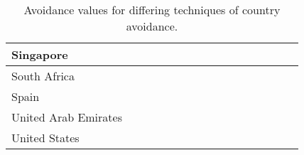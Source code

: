 \begin{table*}[t]
\begin{tabular}{|P{37mm}|ccc|ccc|ccc|ccc|ccc|}
Singapore            &     &   &     &  &    &   &    &     &  & \\\hline
South Africa         &     &   &     &  &    &   &    &     &  & \\\hline
Spain                &     &   &     &  &    &   &    &     &  & \\\hline
United Arab Emirates &     &   &     &  &    &   &    &     &  & \\\hline
United States        &     &   &     &  &    &   &    &     &  & \\\hline
\end{tabular}
\caption{Avoidance values for differing techniques of country avoidance.}
\label{tab:avoid}
\end{table*}
